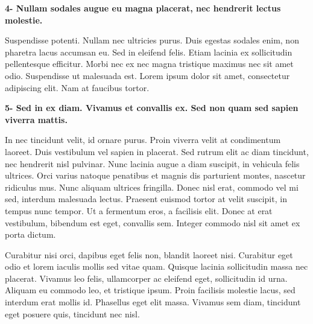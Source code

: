 \documentclass[a4paper, 11pt]{article}
\begin{document}
\textbf{4- Nullam sodales augue eu magna placerat, nec hendrerit lectus molestie.}

Suspendisse potenti. Nullam nec ultricies purus. Duis egestas sodales enim, non pharetra lacus accumsan eu. Sed in eleifend felis. Etiam lacinia ex sollicitudin pellentesque efficitur. Morbi nec ex nec magna tristique maximus nec sit amet odio. Suspendisse ut malesuada est. Lorem ipsum dolor sit amet, consectetur adipiscing elit. Nam at faucibus tortor.

\textbf{5- Sed in ex diam. Vivamus et convallis ex. Sed non quam sed sapien viverra mattis.}

In nec tincidunt velit, id ornare purus. Proin viverra velit at condimentum laoreet. Duis vestibulum vel sapien in placerat. Sed rutrum elit ac diam tincidunt, nec hendrerit nisl pulvinar. Nunc lacinia augue a diam suscipit, in vehicula felis ultrices. Orci varius natoque penatibus et magnis dis parturient montes, nascetur ridiculus mus. Nunc aliquam ultrices fringilla. Donec nisl erat, commodo vel mi sed, interdum malesuada lectus. Praesent euismod tortor at velit suscipit, in tempus nunc tempor. Ut a fermentum eros, a facilisis elit. Donec at erat vestibulum, bibendum est eget, convallis sem. Integer commodo nisl sit amet ex porta dictum.

Curabitur nisi orci, dapibus eget felis non, blandit laoreet nisi. Curabitur eget odio et lorem iaculis mollis sed vitae quam. Quisque lacinia sollicitudin massa nec placerat. Vivamus leo felis, ullamcorper ac eleifend eget, sollicitudin id urna. Aliquam eu commodo leo, et tristique ipsum. Proin facilisis molestie lacus, sed interdum erat mollis id. Phasellus eget elit massa. Vivamus sem diam, tincidunt eget posuere quis, tincidunt nec nisl.
\end{document}
